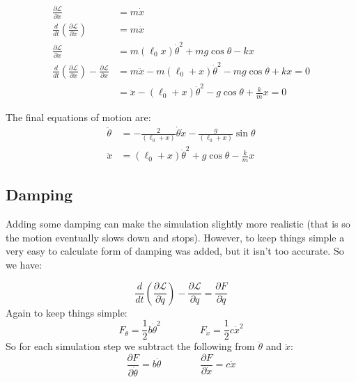 \documentclass[letterpaper,8pt]{article}
\begin{document}
\begin{align*}
\frac{\partial \mathcal{L}}{\partial \dot{x}} &= m \dot{x} \\
\frac{d}{dt} \left( \frac{\partial \mathcal{L}}{\partial \dot{x}} \right) &= m \ddot{x} \\
\frac{\partial \mathcal{L}}{\partial x} &= m (\ell_0 x) \dot{\theta}^2 + mg \cos \theta - kx \\
\frac{d}{dt} \left( \frac{\partial \mathcal{L}}{\partial \dot{x}} \right) - \frac{\partial \mathcal{L}}{\partial x} &=
m \ddot{x} - m (\ell_0 + x) \dot{\theta}^2 - mg \cos \theta + kx = 0 \\
&= \ddot{x} - (\ell_0 + x) \dot{\theta}^2 - g \cos \theta + \frac{k}{m}x = 0
\end{align*}

The final equations of motion are:
\begin{align*}
\ddot{\theta} &= - \frac{2}{(\ell_0 + x)} \dot{\theta} \dot{x} - \frac{g}{(\ell_0 + x)} \sin\theta \\
\ddot{x} &= (\ell_0 + x) \dot{\theta}^2 + g \cos \theta - \frac{k}{m}x
\end{align*}



\subsection{Damping}

Adding some damping can make the simulation slightly more realistic (that is so the motion eventually slows down and stops).   However, 
to keep things simple a very easy to calculate form of damping was added, but it isn't too accurate.  So we have:

\[
\frac{d}{dt} \left( \frac{\partial \mathcal{L}}{\partial \dot{q}} \right) - \frac{\partial \mathcal{L}}{\partial q} 
= \frac{\partial F}{\partial \dot{q}}
\]
Again to keep things simple:
\[
F_{\dot{\theta}} = \frac{1}{2} b\dot{\theta}^2 
\qquad\qquad
F_{\dot{x}} = \frac{1}{2} c \dot{x}^2
\]
So for each simulation step we subtract the following from $\ddot{\theta}$ and $\ddot{x}$:
\[
\frac{\partial F}{\partial \dot{\theta}} = b\dot{\theta}
\qquad\qquad
\frac{\partial F}{\partial \dot{x}} = c\dot{x}
\]
\end{document}
